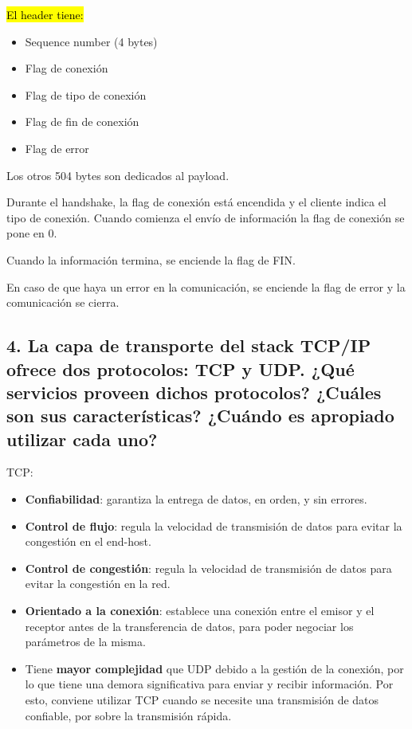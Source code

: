 \documentclass{article}
\begin{document}
\hl{El header tiene:}

\begin{itemize}
\item
  Sequence number (4 bytes)
\item
  Flag de conexión
\item
  Flag de tipo de conexión
\item
  Flag de fin de conexión
\item
  Flag de error
\end{itemize}

Los otros 504 bytes son dedicados al payload.

Durante el handshake, la flag de conexión está encendida y el cliente indica el tipo de conexión. Cuando comienza el envío de información la flag de conexión se pone en 0.

Cuando la información termina, se enciende la flag de FIN.

En caso de que haya un error en la comunicación, se enciende la flag de error y la comunicación se cierra.

\subsection{\texorpdfstring{\textbf{4. La capa de transporte del stack
TCP/IP ofrece dos protocolos: TCP y UDP. ¿Qué servicios proveen dichos
protocolos? ¿Cuáles son sus características? ¿Cuándo es apropiado
utilizar cada
uno?}}{4. La capa de transporte del stack TCP/IP ofrece dos protocolos: TCP y UDP. ¿Qué servicios proveen dichos protocolos? ¿Cuáles son sus características? ¿Cuándo es apropiado utilizar cada uno?}}\label{la-capa-de-transporte-del-stack-tcpip-ofrece-dos-protocolos-tcp-y-udp.-quuxe9-servicios-proveen-dichos-protocolos-cuuxe1les-son-sus-caracteruxedsticas-cuuxe1ndo-es-apropiado-utilizar-cada-uno}

TCP:

\begin{itemize}
\item
  \textbf{Confiabilidad}: garantiza la entrega de datos, en orden, y sin errores.
\item
  \textbf{Control de flujo}: regula la velocidad de transmisión de datos para evitar la congestión en el end-host.
\item
  \textbf{Control de congestión}: regula la velocidad de transmisión de datos para evitar la congestión en la red.
\item
  \textbf{Orientado a la conexión}: establece una conexión entre el emisor y el receptor antes de la transferencia de datos, para poder negociar los parámetros de la misma.
\item
  Tiene \textbf{mayor complejidad} que UDP debido a la gestión de la conexión, por lo que tiene una demora significativa para enviar y recibir información. Por esto, conviene utilizar TCP cuando se necesite una transmisión de datos confiable, por sobre la transmisión rápida.
\end{itemize}
\end{document}
